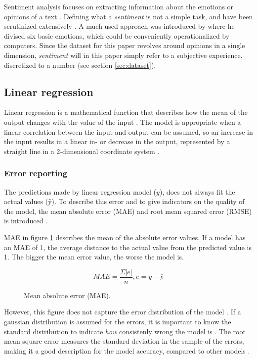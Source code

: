 \documentclass[a4paper]{article}
\begin{document}
Sentiment analysis focuses on extracting information about the emotions or
opinions of a text \citep{PangLee2008}.
Defining what a \textit{sentiment} is not a simple task, and have been
scrutinized extensively \citep{Jurafsky2000, PangLee2008}.
A much used approach was introduced by \cite{Ekman92} where he divised six
basic emotions, which could be conveniently operationalized by computers.
Since the dataset for this paper revolves around opinions in a single dimension,
\textit{sentiment} will in this paper simply refer to a subjective experience,
discretized to a number (see section \ref{sec:dataset}).

\subsection{Linear regression}
Linear regression is a mathematical function that describes how the mean of the
output changes with the value of the input \citep{Agresti2008}. The model is
appropriate when a linear correlation between the input and output can be
assumed, so an increase in the input results in a linear in- or decrease in
the output, represented by a straight line in a 2-dimensional coordinate system
\citep{Agresti2008}.

\subsubsection{Error reporting}
The predictions made by linear regression model ($y$), does not always fit
the actual values ($ŷ$). To describe this error and to give indicators on the
quality of the model, the mean absolute error (MAE) and root mean squared
error (RMSE) is introduced \citep{Agresti2008, Chai2014}.

MAE in figure \ref{fig:mae} describes the mean of the absolute error values.
If a model has an MAE of 1, the average distance to the actual value from the
predicted value is 1. The bigger the mean error value, the worse the model is.

\begin{figure}
\[MAE = \frac{\Sigma |e|}{n}, e = y - ŷ\]
\caption{Mean absolute error (MAE).}
\label{fig:mae}
\end{figure}

However, this figure does not capture the error distribution of the model
\citep{Chai2014}. If
a gaussian distribution is assumed for the errors, it is important to know
the standard distribution to indicate \textit{how} consistenly wrong the model
is \citep{Agresti2008}. The root mean square error measures the standard
deviation in the sample of the errors, making it a good description for the
model accuracy, compared to other models \citep{Agresti2008, Chai2014}.
\end{document}
